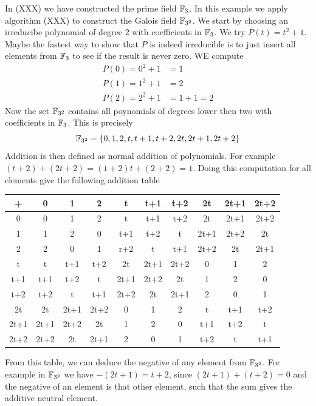 \begin{example}In (XXX) we have constructed the prime field $\mathbb{F}_3$. In this example we apply algorithm (XXX) to construct the Galois field $\mathbb{F}_{3^2}$. We start by choosing an irreducibe polynomial of degree $2$ with coefficients in $\mathbb{F}_3$. We try 
$P(t)=t^2+1$. Maybe the fastest way to show that $P$ is indeed irreducible is to just insert all elements from $\mathbb{F}_3$ to see if the result is never zero. WE compute
\begin{align*}
P(0) = 0^2+1 &= 1\\
P(1) = 1^2+1 &= 2\\
P(2) = 2^2+1 &=  1+1  = 2
\end{align*}
Now the set $\mathbb{F}_{3^2}$ contains all poynomials of degrees lower then two with coefficients in $\mathbb{F}_3$. This is precisely
$$
\mathbb{F}_{3^2}=\{0,1,2,t,t+1,t+2,2t,2t+1,2t+2\}
$$
Addition is then defined as normal addition of polynomials. For example 
$(t+2) + (2t+2)= (1+2)t +(2+2)= 1$. Doing this computation for all elements give the following addition table
\begin{center}
  \begin{tabular}{c | c c c c c c c c c}
    + & 0    & 1    & 2    & t    & t+1  & t+2  & 2t   & 2t+1 & 2t+2 \\\hline
    0 & 0    & 1    & 2    & t    & t+1  & t+2  & 2t   & 2t+1 & 2t+2 \\
    1 & 1    & 2    & 0    & t+1  & t+2  & t    & 2t+1 & 2t+2 & 2t   \\
    2 & 2    & 0    & 1    & r+2  & t    & t+1  & 2t+2 & 2t   & 2t+1 \\
    t & t    & t+1  & t+2  & 2t   & 2t+1 & 2t+2 & 0    & 1    & 2    \\
  t+1 & t+1  & t+2  & t    & 2t+1 & 2t+2 & 2t   & 1    & 2    & 0    \\
  t+2 & t+2  & t    & t+1  & 2t+2 & 2t   & 2t+1 & 2    & 0    & 1    \\
   2t & 2t   & 2t+1 & 2t+2 & 0    & 1    & 2    & t    & t+1  & t+2  \\
 2t+1 & 2t+1 & 2t+2 & 2t   & 1    & 2    & 0    & t+1  & t+2  & t    \\
 2t+2 & 2t+2 & 2t   & 2t+1 & 2    & 0    & 1    & t+2  & t    & t+1
  \end{tabular}
\end{center}
From this table, we can deduce the negative of any element from $\mathbb{F}_{3^2}$. For example in $\mathbb{F}_{3^2}$ we have $-(2t+1)= t+2$, since $(2t+1) + (t+2)=0$ and the negative of an element is that other element, such that the sum gives the additive neutral element.


\end{example}
